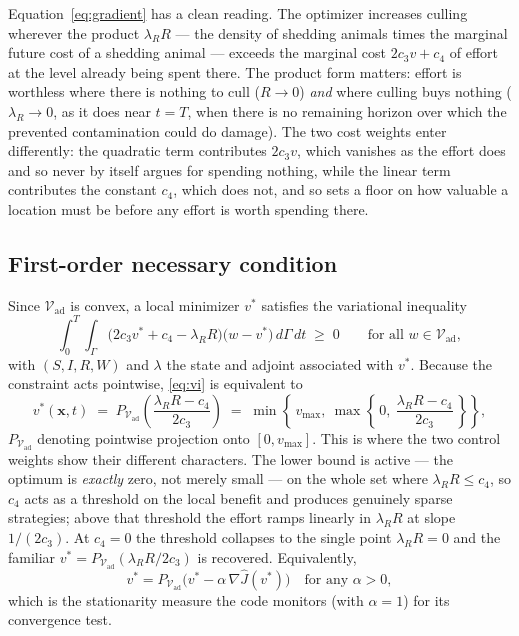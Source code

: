 \documentclass[11pt]{article}
\newcommand{\Vad}{\mathcal{V}_{\mathrm{ad}}}
\begin{document}
Equation~\eqref{eq:gradient} has a clean reading. The optimizer increases culling wherever the product $\lambda_R R$ --- the density of shedding animals times the marginal future cost of a shedding animal --- exceeds the marginal cost $2c_3 v + c_4$ of effort at the level already being spent there. The product form matters: effort is worthless where there is nothing to cull ($R \to 0$) \emph{and} where culling buys nothing ($\lambda_R \to 0$, as it does near $t=T$, when there is no remaining horizon over which the prevented contamination could do damage). The two cost weights enter differently: the quadratic term contributes $2c_3v$, which vanishes as the effort does and so never by itself argues for spending nothing, while the linear term contributes the constant $c_4$, which does not, and so sets a floor on how valuable a location must be before any effort is worth spending there.

\subsection{First-order necessary condition}

Since $\Vad$ is convex, a local minimizer $v^*$ satisfies the variational inequality
\begin{equation}
\int_0^T\!\!\int_\Gamma \Big(2c_3 v^* + c_4 - \lambda_R R\Big)\big(w - v^*\big)\,d\Gamma\,dt \;\ge\; 0
\qquad \text{for all } w\in\Vad,
\label{eq:vi}
\end{equation}
with $(S,I,R,W)$ and $\lambda$ the state and adjoint associated with $v^*$. Because the constraint acts pointwise, \eqref{eq:vi} is equivalent to
\begin{equation}
v^*(\mathbf{x},t)
\;=\; P_{\Vad}\!\left(\frac{\lambda_R R - c_4}{2c_3}\right)
\;=\; \min\left\{\,v_{\max},\ \max\left\{\,0,\ \frac{\lambda_R R - c_4}{2c_3}\,\right\}\right\},
\label{eq:pointwise-optimality}
\end{equation}
$P_{\Vad}$ denoting pointwise projection onto $[0,v_{\max}]$. This is where the two control weights show their different characters. The lower bound is active --- the optimum is \emph{exactly} zero, not merely small --- on the whole set where $\lambda_R R \le c_4$, so $c_4$ acts as a threshold on the local benefit and produces genuinely sparse strategies; above that threshold the effort ramps linearly in $\lambda_R R$ at slope $1/(2c_3)$. At $c_4=0$ the threshold collapses to the single point $\lambda_R R = 0$ and the familiar $v^* = P_{\Vad}(\lambda_R R/2c_3)$ is recovered. Equivalently,
\begin{equation}
v^* = P_{\Vad}\big(v^* - \alpha\,\nabla\hat J(v^*)\big) \quad\text{for any } \alpha>0,
\label{eq:stationarity}
\end{equation}
which is the stationarity measure the code monitors (with $\alpha=1$) for its convergence test.
\end{document}
